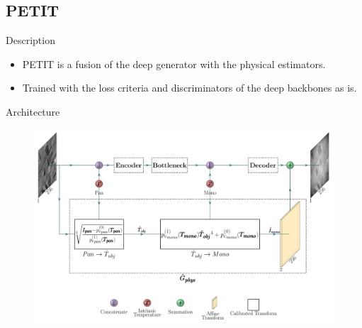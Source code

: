 \subsection{PETIT}
\begin{frame}{Description}
  \begin{itemize}
    \item PETIT is a fusion of the deep generator with the physical estimators.
    \item Trained with the loss criteria and discriminators of the deep backbones as is.
  \end{itemize}
\end{frame}

\begin{frame}{Architecture}
  \begin{figure}
    \centering
    \includegraphics[width=\linewidth]{../figs/network/src/petit.pdf}
  \end{figure}
\end{frame}